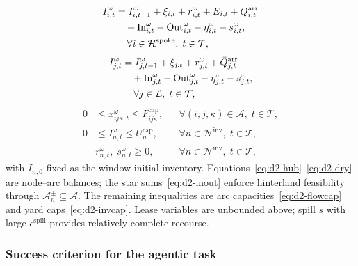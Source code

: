 \documentclass[a4paper,fleqn]{cas-sc}
\begin{document}
\begin{equation}
\begin{aligned}
I_{i,t}^{\omega}
&=I_{i,t-1}^{\omega}+\xi_{i,t}+r_{i,t}^{\omega}+E_{i,t}
 +\bar{Q}_{i,t}^{\mathrm{arr}}
\\
&\quad{}
 +\mathrm{In}_{i,t}^{\omega}-\mathrm{Out}_{i,t}^{\omega}
 -\eta_{i,t}^{\omega}-s_{i,t}^{\omega},
\\
&\hspace{1.2em}
\forall i\in\mathcal{H}^{\mathrm{spoke}},\; t\in\mathcal{T},
\end{aligned}
\label{eq:d2-spoke}
\end{equation}
\begin{equation}
\begin{aligned}
I_{j,t}^{\omega}
&=I_{j,t-1}^{\omega}+\xi_{j,t}+r_{j,t}^{\omega}
 +\bar{Q}_{j,t}^{\mathrm{arr}}
\\
&\quad{}
 +\mathrm{In}_{j,t}^{\omega}-\mathrm{Out}_{j,t}^{\omega}
 -\eta_{j,t}^{\omega}-s_{j,t}^{\omega},
\\
&\hspace{1.2em}
\forall j\in\mathcal{L},\; t\in\mathcal{T},
\end{aligned}
\label{eq:d2-dry}
\end{equation}
\begin{align}
0&\le x_{ij\kappa,t}^{\omega}\le F_{ij\kappa}^{\mathrm{cap}},
&&\forall(i,j,\kappa)\in\mathcal{A},\;t\in\mathcal{T},
\label{eq:d2-flowcap}\\
0&\le I_{n,t}^{\omega}\le U_n^{\mathrm{cap}},
&&\forall n\in\mathcal{N}^{\mathrm{inv}},\;t\in\mathcal{T},
\label{eq:d2-invcap}\\
&r_{n,t}^{\omega},\;s_{n,t}^{\omega}\ge 0,
&&\forall n\in\mathcal{N}^{\mathrm{inv}},\;t\in\mathcal{T},
\label{eq:d2-nn}
\end{align}
with $I_{n,0}$ fixed as the window initial inventory.
Equations~\eqref{eq:d2-hub}--\eqref{eq:d2-dry} are node--arc balances;
the star sums~\eqref{eq:d2-inout} enforce hinterland feasibility through
$\mathcal{A}_n^{\pm}\subseteq\mathcal{A}$.
The remaining inequalities are arc capacities~\eqref{eq:d2-flowcap} and yard
caps~\eqref{eq:d2-invcap}. Lease variables are unbounded above; spill \(s\)
with large \(c^{\mathrm{spill}}\) provides relatively complete recourse.

\subsubsection{Success criterion for the agentic task}
\label{sec:ecr_success}
\end{document}
